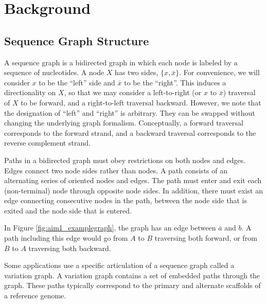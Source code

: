 \documentclass[11pt]{ucscthesis}
\begin{document}
\section{Background}

\subsection{Sequence Graph Structure}


A sequence graph is a bidirected graph in which each node is labeled by a sequence of nucleotides.
A node $X$ has two sides, $\{x, \bar{x}\}$. For convenience, we will consider $x$  to be the ``left'' side and $\bar x$ to be the ``right''.
This induces a directionality on $X$, so that we may consider a left-to-right (or $x$ to $\bar{x}$) traversal of $X$ to be forward, and a right-to-left traversal backward.
However, we note that the designation of ``left'' and ``right'' is arbitrary.
They can be swapped without changing the underlying graph formalism.
Conceptually, a forward traversal corresponds to the forward strand, and a backward traversal corresponds to the reverse complement strand.

Paths in a bidirected graph must obey restrictions on both nodes and edges.
Edges connect two node sides rather than nodes.
A path consists of an alternating series of oriented nodes and edges.
The path must enter and exit each (non-terminal) node through opposite node sides.
In addition, there must exist an edge connecting consecutive nodes in the path, between the node side that is exited and the node side that is entered.

In Figure \ref{fig:aim1_examplegraph}, the graph has an edge between $\bar{a}$ and $b$.
A path including this edge would go from $A$ to $B$ traversing both forward, or from $B$ to $A$ traversing both backward.
    
Some applications use a specific articulation of a sequence graph called a variation graph.
A variation graph contains a set of embedded paths through the graph.
These paths typically correspond to the primary and alternate scaffolds of a reference genome.
\end{document}
